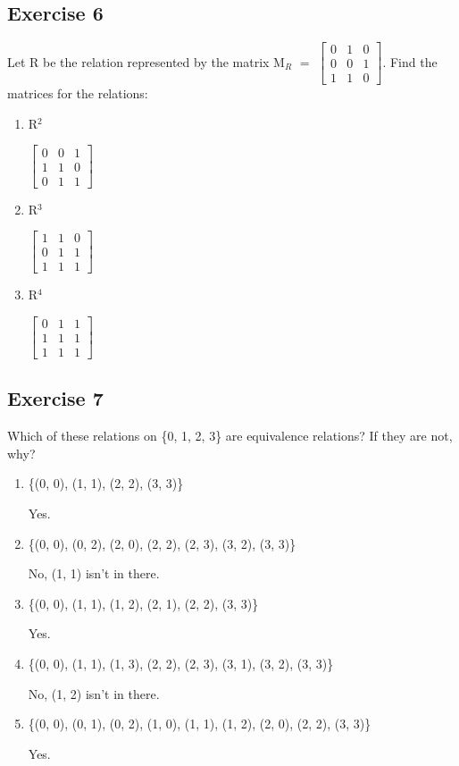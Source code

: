 \documentclass{article}
\newcommand{\mt}[1]{\ensuremath{#1}}
\newcommand\ssc[2][\DefaultOpt]{%
  \def\DefaultOpt{#2}%
  \subsection[#1]{#2}%
}
\newcommand{\balist}{\begin{enumerate}[label=\alph*.]}
\newcommand{\elist}{\end{enumerate}}
\newcommand{\bk}[1]{\{#1\}}
\newcommand{\eql}{\mt{=} }
\newcommand{\uw}[2]{#1\mt{_{#2}}}
\newcommand{\uf}[2]{#1\mt{^{#2}}}
\begin{document}
\ssc{Exercise 6}{

Let R be the relation represented by the matrix \uw{M}{R} \eql \mt{\begin{bmatrix}{}
  0 & 1 & 0 \\
  0 & 0 & 1 \\
  1 & 1 & 0
\end{bmatrix}
}.
Find the matrices for the relations:

\balist
\item \uf{R}{2}

\mt{\begin{bmatrix}{}
  0 & 0 & 1 \\
  1 & 1 & 0 \\
  0 & 1 & 1
\end{bmatrix}
}

\item \uf{R}{3}

\mt{\begin{bmatrix}{}
  1 & 1 & 0 \\
  0 & 1 & 1 \\
  1 & 1 & 1
\end{bmatrix}
}

\item \uf{R}{4}

\mt{\begin{bmatrix}{}
  0 & 1 & 1 \\
  1 & 1 & 1 \\
  1 & 1 & 1
\end{bmatrix}
}

\elist

}

\ssc{Exercise 7}{

Which of these relations on \bk{0, 1, 2, 3} are equivalence relations? If they are not, why?

\balist 
\item \bk{(0, 0), (1, 1), (2, 2), (3, 3)}

Yes.

\item \bk{(0, 0), (0, 2), (2, 0), (2, 2), (2, 3), (3, 2), (3, 3)}

No, (1, 1) isn't in there.

\item \bk{(0, 0), (1, 1), (1, 2), (2, 1), (2, 2), (3, 3)}

Yes.

\item \bk{(0, 0), (1, 1), (1, 3), (2, 2), (2, 3), (3, 1), (3, 2), (3, 3)}

No, (1, 2) isn't in there.

\item \bk{(0, 0), (0, 1), (0, 2), (1, 0), (1, 1), (1, 2), (2, 0), (2, 2), (3, 3)}

Yes.

\elist 

}
\end{document}
